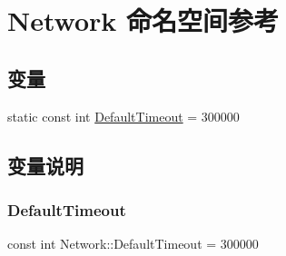 \hypertarget{namespace_network}{}\section{Network 命名空间参考}
\label{namespace_network}
\subsection*{变量}
\begin{DoxyCompactItemize}
\item 
static const int \mbox{\hyperlink{namespace_network_afd5030f905ae36a8095c9603ba478b3b}{Default\+Timeout}} = 300000
\end{DoxyCompactItemize}


\subsection{变量说明}
\mbox{\label{namespace_network_afd5030f905ae36a8095c9603ba478b3b}} 
\subsubsection{\texorpdfstring{Default\+Timeout}{DefaultTimeout}}
{\footnotesize\ttfamily const int Network\+::\+Default\+Timeout = 300000\hspace{0.3cm}{\ttfamily [static]}}

